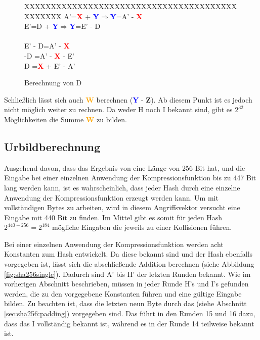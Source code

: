 \begin{figure}[!h]
  \begin{tabbing}
    XXXXXXXXXXXXXXXXXXXXX\=XX\=XX\=XXXXXX\=XXXX\=XX\=XX\=XXXXXXXX \kill
    \>A'\>=\>\textcolor{red}{\textbf{X}} + \textcolor{blue}{\textbf{Y}}\>$\Rightarrow$\>\textcolor{blue}{\textbf{Y}}\>=\>A' - \textcolor{red}{\textbf{X}}\\
    \>E'\>=\>D + \textcolor{blue}{\textbf{Y}}\>$\Rightarrow$\>\textcolor{blue}{\textbf{Y}}\>=\>E' - D\\
    \>~\\
    \>\>\>E' - D\>=\>A' - \textcolor{red}{\textbf{X}}\\
    \>\>\>-D    \>=\>A' - \textcolor{red}{\textbf{X}} - E'\\
    \>\>\>D     \>=\>\textcolor{red}{\textbf{X}} + E' - A'
  \end{tabbing}
  \caption{Berechnung von D}
  \label{eq:calcD}
\end{figure}

Schließlich lässt sich auch \textcolor{orange}{\textbf{W}} berechnen (\textcolor{blue}{\textbf{Y}} - \textcolor{Strong Green}{\textbf{Z}}). Ab diesem Punkt ist
es jedoch nicht möglich weiter zu rechnen. Da weder H noch I bekannt sind, gibt es $2^{32}$ Möglichkeiten die Summe \textcolor{orange}{\textbf{W}} zu bilden.

\subsection{Urbildberechnung}
\label{sec:urbildberechnung}
Ausgehend davon, dass das Ergebnis von  eine Länge von 256 Bit hat, und die Eingabe bei einer einzelnen Anwendung der Kompressionsfunktion bis zu
447 Bit lang werden kann, ist es wahrscheinlich, dass jeder Hash durch eine einzelne Anwendung der Kompressionsfunktion erzeugt werden kann. Um mit vollständigen
Bytes zu arbeiten, wird in diesem Angriffsvektor versucht eine Eingabe mit 440 Bit zu finden. Im Mittel gibt es somit für jeden Hash $2^{440-256} = 2^{184}$
mögliche Eingaben die jeweils zu einer Kollisionen führen.

Bei einer einzelnen Anwendung der Kompressionsfunktion werden acht Konstanten zum Hash entwickelt. Da diese bekannt sind und der Hash ebenfalls vorgegeben ist,
lässt sich die abschließende Addition berechnen (siehe Abbildung \ref{fig:sha256single}). Dadurch sind A' bis H' der letzten Runden bekannt. Wie im vorherigen
Abschnitt beschrieben, müssen in jeder Runde H's und I's gefunden werden, die zu den vorgegebene Konstanten führen und eine gültige Eingabe bilden. Zu beachten
ist, dass die letzten neun Byte durch das  (siehe Abschnitt \ref{sec:sha256:padding}) vorgegeben sind. Das führt in den Runden 15 und 16 dazu, dass
das I vollständig bekannt ist, während es in der Runde 14 teilweise bekannt ist.

